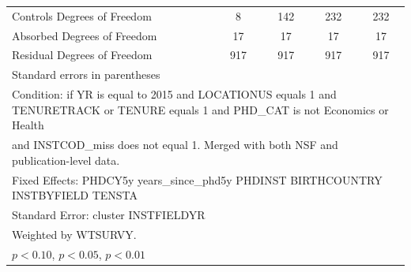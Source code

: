 \begin{table}[htbp]
\begin{tabular}{l*{4}{c}}
Controls Degrees of Freedom&           8         &         142         &         232         &         232         \\
Absorbed Degrees of Freedom&          17         &          17         &          17         &          17         \\
Residual Degrees of Freedom&         917         &         917         &         917         &         917         \\
\hline\hline
\multicolumn{5}{l}{\footnotesize Standard errors in parentheses}\\
\multicolumn{5}{l}{\footnotesize Condition: if YR is equal to 2015 and LOCATIONUS equals 1 and TENURETRACK or TENURE equals 1 and PHD\_CAT is not Economics or Health}\\
\multicolumn{5}{l}{\footnotesize and INSTCOD\_miss does not equal 1. Merged with both NSF and publication-level data.}\\
\multicolumn{5}{l}{\footnotesize Fixed Effects: PHDCY5y years\_since\_phd5y PHDINST BIRTHCOUNTRY INSTBYFIELD TENSTA}\\
\multicolumn{5}{l}{\footnotesize Standard Error: cluster INSTFIELDYR}\\
\multicolumn{5}{l}{\footnotesize Weighted by WTSURVY.}\\
\multicolumn{5}{l}{\footnotesize \sym{*} \(p<0.10\), \sym{**} \(p<0.05\), \sym{***} \(p<0.01\)}\\
\end{tabular}
\end{table}
